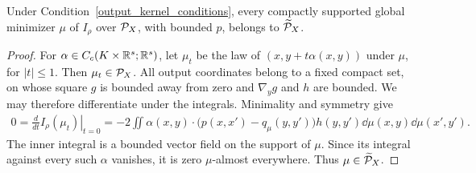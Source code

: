 \begin{proposition}\label{prop:minimizer-stationarity}
Under Condition~\ref{output_kernel_conditions}, every compactly supported global minimizer $\mu$ of $I_\rho$ over $\mathcal P_X$, with bounded $p$, belongs to $\widetilde{\mathcal P}_X$.
\end{proposition}
\begin{proof}
For $\alpha\in C_c(K\times\mathbb{R}^s;\mathbb{R}^s)$, let $\mu_t$ be the law of $(x,y+t\alpha(x,y))$ under $\mu$, for $|t|\leq1$. Then $\mu_t\in\mathcal P_X$. All output coordinates belong to a fixed compact set, on whose square $g$ is bounded away from zero and $\nabla_y g$ and $h$ are bounded. We may therefore differentiate under the integrals. Minimality and symmetry give
\begin{align}
0=\left.\frac{d}{dt}I_\rho(\mu_t)\right|_{t=0}
=-2\iint\alpha(x,y)\cdot\bigl(p(x,x')-q_\mu(y,y')\bigr)
 h(y,y')\dd\mu(x,y)\dd\mu(x',y').
\end{align}
The inner integral is a bounded vector field on the support of $\mu$. Since its integral against every such $\alpha$ vanishes, it is zero $\mu$-almost everywhere. Thus $\mu\in\widetilde{\mathcal P}_X$.
\end{proof}

